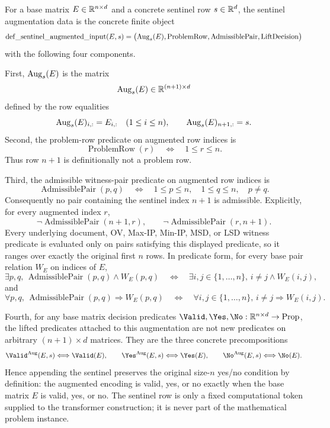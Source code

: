 \begin{definition}
  \label{def:sentinel-augmented-input}
  For a base matrix $E\in\mathbb{R}^{n\times d}$ and a concrete sentinel row
  $s\in\mathbb{R}^d$, the sentinel augmentation data is the concrete finite object
  \[
    \operatorname{def\_sentinel\_augmented\_input}(E,s)
    =
    \bigl(\operatorname{Aug}_s(E),\operatorname{ProblemRow},
      \operatorname{AdmissiblePair},\operatorname{LiftDecision}\bigr)
  \]
  with the following four components.

  First, $\operatorname{Aug}_s(E)$ is the matrix
  \[
    \operatorname{Aug}_s(E)\in\mathbb{R}^{(n+1)\times d}
  \]
  defined by the row equalities
  \[
    \operatorname{Aug}_s(E)_{i,:}=E_{i,:}\quad(1\leq i\leq n),
    \qquad
    \operatorname{Aug}_s(E)_{n+1,:}=s.
  \]
  Second, the problem-row predicate on augmented row indices is
  \[
    \operatorname{ProblemRow}(r)\quad\Longleftrightarrow\quad
    1\leq r\leq n .
  \]
  Thus row $n+1$ is definitionally not a problem row.

  Third, the admissible witness-pair predicate on augmented row indices is
  \[
    \operatorname{AdmissiblePair}(p,q)
    \quad\Longleftrightarrow\quad
    1\leq p\leq n,\quad 1\leq q\leq n,\quad p\neq q .
  \]
  Consequently no pair containing the sentinel index $n+1$ is admissible.
  Explicitly, for every augmented index $r$,
  \[
    \neg\operatorname{AdmissiblePair}(n+1,r),
    \qquad
    \neg\operatorname{AdmissiblePair}(r,n+1).
  \]
  Every underlying document, OV, Max-IP, Min-IP, MSD, or LSD witness predicate
  is evaluated only on pairs satisfying this displayed predicate, so it ranges
  over exactly the original first $n$ rows.  In predicate form, for every base
  pair relation $W_E$ on indices of $E$,
  \[
    \exists p,q,\,
      \operatorname{AdmissiblePair}(p,q)\wedge W_E(p,q)
    \quad\Longleftrightarrow\quad
    \exists i,j\in\{1,\ldots,n\},\, i\neq j\wedge W_E(i,j),
  \]
  and
  \[
    \forall p,q,\,
      \operatorname{AdmissiblePair}(p,q)\Rightarrow W_E(p,q)
    \quad\Longleftrightarrow\quad
    \forall i,j\in\{1,\ldots,n\},\, i\neq j\Rightarrow W_E(i,j).
  \]

  Fourth, for any base matrix decision predicates
  $\Valid,\Yes,\No:\R^{n\times d}\to\operatorname{Prop}$, the lifted predicates
  attached to this augmentation are not new predicates on arbitrary
  $(n+1)\times d$ matrices.  They are the three concrete precompositions
  \[
    \Valid^{\Aug}(E,s)\Longleftrightarrow\Valid(E),\qquad
    \Yes^{\Aug}(E,s)\Longleftrightarrow\Yes(E),\qquad
    \No^{\Aug}(E,s)\Longleftrightarrow\No(E).
  \]
  Hence appending the sentinel preserves the original size-$n$ yes/no
  condition by definition: the augmented encoding is valid, yes, or no exactly
  when the base matrix $E$ is valid, yes, or no.  The sentinel row is only a
  fixed computational token supplied to the transformer construction; it is
  never part of the mathematical problem instance.
\end{definition}

